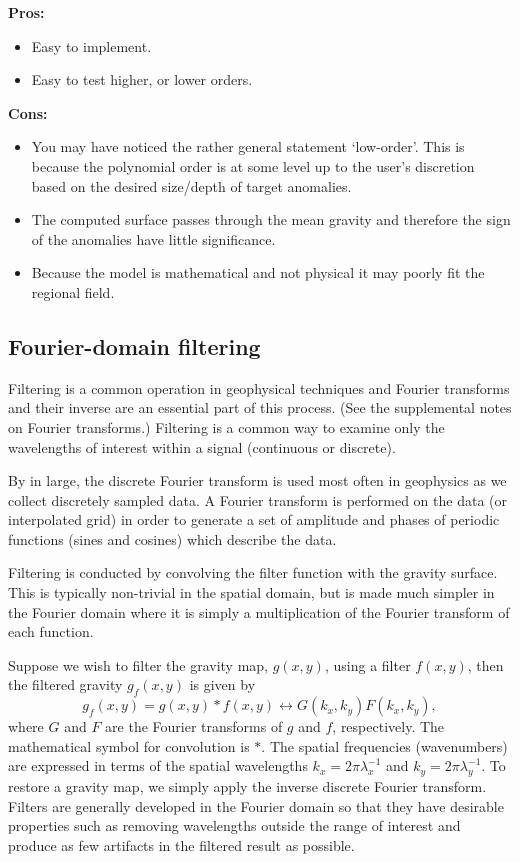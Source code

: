 {\bf Pros:}
\begin{itemize} %
    \item Easy to implement.
    \item Easy to test higher, or lower orders.
\end{itemize}
{\bf Cons:}
\begin{itemize}
    \item You may have noticed the rather general statement `low-order'.  This is because the polynomial order is at some level up to the user's
    discretion based on the desired size/depth of target anomalies.

    \item The computed surface passes through the mean gravity and therefore the sign of the anomalies have little significance.

    \item Because the model is mathematical and not physical it may poorly fit the regional field.
\end{itemize}

\subsection{Fourier-domain filtering}
Filtering is a common operation in geophysical techniques and Fourier transforms and their inverse are an essential part of this process.  (See the supplemental notes on Fourier transforms.)  Filtering is a common way to examine only the wavelengths of interest within a signal (continuous or discrete).

By in large, the discrete Fourier transform is used most often in geophysics as we collect discretely sampled data.  A Fourier transform is performed on the data (or interpolated grid) in order to generate a set of amplitude and phases of periodic functions (sines and cosines) which describe the data.

Filtering is conducted by convolving the filter function with the gravity surface.  This is typically non-trivial in the spatial domain, but is made much simpler in the Fourier domain where it is simply a multiplication of the Fourier transform of each function.

Suppose we wish to filter the gravity map, $g(x,y)$, using a filter $f(x,y)$, then the filtered gravity $g_{f}(x,y)$ is given by
\begin{equation}
    g_f(x,y) = g(x,y) * f(x,y) \longleftrightarrow G(k_{x},k_{y}) F(k_{x},k_{y}),
\end{equation}
where $G$ and $F$ are the Fourier transforms of $g$ and $f$, respectively.  The mathematical symbol for convolution is $*$.  The spatial frequencies (wavenumbers) are expressed in terms of the spatial wavelengths $k_{x} = 2\pi \lambda_{x}^{-1}$ and $k_{y} = 2\pi \lambda_{y}^{-1}$.  To restore a gravity map, we simply apply the inverse discrete Fourier transform.  Filters are generally developed in the Fourier domain so that they have desirable properties such as removing wavelengths outside the range of interest and produce as few artifacts in the filtered result as possible.

